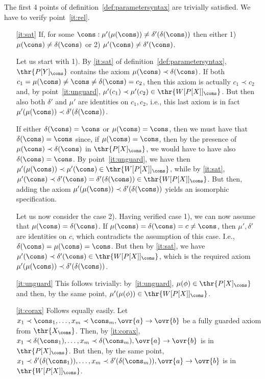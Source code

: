 \begin{PROOF}
The first 4 points of definition~\ref{def:parametersyntax} are trivially
satisfied. We have to verify point~\ref{it:rel}. 
\begin{itemize}
\item[\ref{it:sat}]
If, for some $\cons:\mu'(\mu(\cons))\not=\delta'(\delta(\cons))$ then either 1)
$\mu(\cons)\not=\delta(\cons)$ or 2)
$\mu'(\cons)\not=\delta'(\cons)$. 

Let us start with 1). By \ref{it:sat} of
definition~\ref{def:parametersyntax}, $\thr{P[Y]_\cons}$ contains the axiom
$\mu(\cons)\prec\delta(\cons)$. If both
$c_1=\mu(\cons)\not=\cons\not=\delta(\cons)=c_2$, then this axiom is actually
$c_1\prec c_2$ and,  by point~\ref{it:unguard}, 
$\mu'(c_1)\prec\mu'(c_2)\in\thr{W[P[X]]_\cons}$. But then also both $\delta'$ and
$\mu'$ are identities on $c_1,c_2$, i.e., this last axiom is in fact
$\mu'(\mu(\cons))\prec \delta'(\delta(\cons))$. 

If either $\delta(\cons)=\cons$ or $\mu(\cons)=\cons$, then we must have that
$\delta(\cons)=\cons$ since, if  $\mu(\cons)=\cons$, then by the presence of
$\mu(\cons)\prec\delta(\cons)$ in $\thr{P[X]_\cons}$, we would have to have also
$\delta(\cons)=\cons$. By point~\ref{it:unguard}, we have then
$\mu'(\mu(\cons))\prec \mu'(\cons)\in\thr{W[P[X]]_\cons}$, while by
\ref{it:sat}, $\mu'(\cons)\prec \delta'(\cons)=\delta'(\delta(\cons))\in\thr{W[P[X]]_\cons}$. But
then, adding the axiom $\mu'(\mu(\cons))\prec\delta'(\delta(\cons))$ yields
an isomorphic specification. 

Let us now consider the case 2). Having verified case 1), we can now assume that
$\mu(\cons)=\delta(\cons)$. If $\mu(\cons)=\delta(\cons)=c\not=\cons$, then
$\mu',\delta'$ are identities on $c$, which contradicts the assumption of
this case. I.e., $\delta(\cons)=\mu(\cons)=\cons$. But then by \ref{it:sat},
we have $\mu'(\cons)\prec\delta'(\cons)\in\thr{W[P[X]]_\cons}$, which is the
required axiom $\mu'(\mu(\cons))\prec\delta'(\delta(\cons))$. 
%
\item[\ref{it:unguard}] This follows trivially: by~\ref{it:unguard},
$\mu(\phi)\in\thr{P[X]_\cons}$ and then, by the same point,
$\mu'(\mu(\phi))\in\thr{W[P[X]]_\cons}$. 
%
\item[\ref{it:corax}] Follows equally easily. Let 
$x_1\prec\cons_1, \ldots ,x_m\prec\cons_m, \ovr{a} \to \ovr{b}$ be a fully
guarded axiom from $\thr{X_\cons}$. Then, by \ref{it:corax}, 
$x_1\prec\delta(\cons_1), \ldots ,x_m\prec\delta(\cons_m), \ovr{a} \to
\ovr{b}$ is in $\thr{P[X]_\cons}$. But then, by the same point, 
$x_1\prec\delta'(\delta(\cons_1)), \ldots ,x_m\prec\delta'(\delta(\cons_m)),
\ovr{a} \to \ovr{b}$ is in $\thr{W[P[X]]_\cons}$. 
\end{itemize}
\end{PROOF}

